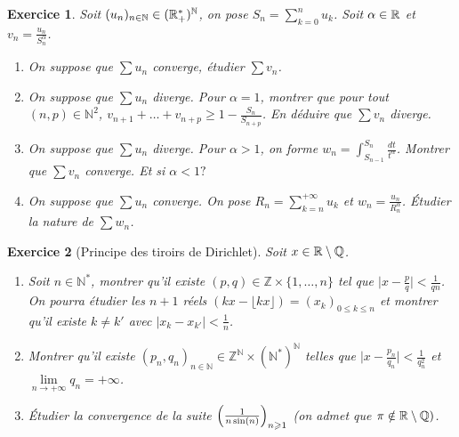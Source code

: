 \documentclass[12pt]{article}
\newtheorem{exercise}{Exercice}[section]
\theoremstyle{remark}
\theoremstyle{remark}
\newcommand{\N}{\mathbb{N}} \newcommand{\Z}{\mathbb{Z}}
\begin{document}
\begin{exercise}
	Soit $(u_{n})_{n\in\N}\in(\R_{+}^{*})^{\N}$, on pose
	$S_{n}=\sum_{k=0}^{n}u_{k}$. Soit $\alpha\in\mathbb{R}$ et
	$v_{n}=\frac{u_{n}}{S_{n}^{\alpha}}$.
	\begin{enumerate}
		\item
		On suppose que $\sum u_{n}$ converge, étudier $\sum v_{n}$.
		\item
		On suppose que $\sum u_{n}$ diverge. Pour $\alpha=1$, montrer que pour
		tout $(n,p)\in\N^{2}$, $v_{n+1}+\dots+v_{n+p}\geqslant
		1-\frac{S_{n}}{S_{n+p}}$. En déduire que $\sum v_{n}$ diverge.
		\item
		On suppose que $\sum u_{n}$ diverge. Pour $\alpha>1$, on forme
		$w_{n}=\int_{S_{n-1}}^{S_{n}}\frac{dt}{t^{\alpha}}$. Montrer que $\sum
		v_{n}$ converge. Et si $\alpha<1?$
		\item
		On suppose que $\sum u_{n}$ converge. On pose
		$R_{n}=\sum_{k=n}^{+\infty}u_{k}$ et $w_{n}=\frac{u_{n}}{R_{n}^{\alpha}}$.
		Étudier la nature de $\sum w_{n}$.
	\end{enumerate}
\end{exercise}

\begin{exercise}[Principe des tiroirs de Dirichlet]
	Soit $x\in\mathbb{R}\setminus\mathbb{Q}$.
	\begin{enumerate}
		\item
		Soit $n\in\N^{*}$, montrer qu'il existe $(p,q)\in\Z\times\{1,\dots,n\}$
		tel que $\bigl\vert x-\frac{p}{q}\bigr\vert<\frac{1}{qn}$. On pourra
		étudier les $n+1$ réels $(kx-\lfloor kx\rfloor)=(x_{k})_{0\leqslant
		k\leqslant n}$ et montrer qu'il existe $k\neq k'$ avec $\vert
		x_{k}-x_{k'}\vert<\frac{1}{n}$.
		\item
		Montrer qu'il existe $(p_{n},q_{n})_{n\in\N}\in\Z^{\N}\times(\N^{*})^{\N}$
		telles que $\bigl\vert
		x-\frac{p_{n}}{q_{n}}\bigr\vert<\frac{1}{q_{n}^{2}}$ et
		$\lim\limits_{n\to+\infty}q_{n}=+\infty$.
		\item
		Étudier la convergence de la suite
		$\Bigl(\frac{1}{n\sin(n)}\Bigr)_{n\geqslant1}$ (on admet que
		$\pi\notin\mathbb{R}\setminus\mathbb{Q})$.
	\end{enumerate}
\end{exercise}
\end{document}
